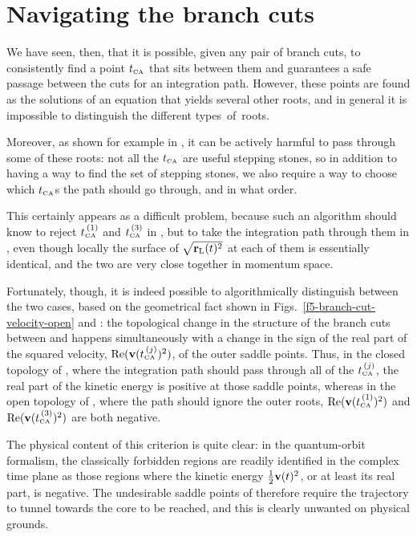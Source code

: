 \section{Navigating the branch cuts}
We have seen, then, that it is possible, given any pair of branch cuts, to consistently find a point ${t_{\scriptscriptstyle\mathrm{CA}}}$ that sits between them and guarantees a safe passage between the cuts for an integration path. However, these points are found as the solutions of an equation that yields several other roots, and in general it is impossible to distinguish the different types~of~roots. 


Moreover, as shown for example in , it can be actively harmful to pass through some of these roots: not all the ${t_{\scriptscriptstyle\mathrm{CA}}}$ are useful stepping stones, so in addition to having a way to find the set of stepping stones, we also require a way to choose which ${t_{\scriptscriptstyle\mathrm{CA}}}$s the path should go through, and in what order.

This certainly appears as a difficult problem, because such an algorithm should know to reject ${t_{\scriptscriptstyle\mathrm{CA}}^{{\,(1)}}}$ and ${t_{\scriptscriptstyle\mathrm{CA}}^{{\,(3)}}}$ in , but to take the integration path through them in , even though locally the surface of $\sqrt{\vb{r}_\mathrm{L}(t)^2}$ at each of them is essentially identical, and the two are very close together in momentum space. 

Fortunately, though, it is indeed possible to algorithmically distinguish between the two cases, based on the geometrical fact shown in Figs.~\ref{f5-branch-cut-velocity-open} and : the topological change in the structure of the branch cuts between  and  happens simultaneously with a change in the sign of the real part of the squared velocity, $\Re(\vb{v}({t_{\scriptscriptstyle\mathrm{CA}}^{{\,(j)}}})^2)$, of the outer saddle points. Thus, in the closed topology of , where the integration path should pass through all of the ${t_{\scriptscriptstyle\mathrm{CA}}^{{\,(j)}}}$, the real part of the kinetic energy is positive at those saddle points, whereas in the open topology of , where the path  should ignore the outer roots, $\Re(\vb{v}({t_{\scriptscriptstyle\mathrm{CA}}^{{\,(1)}}})^2)$ and $\Re(\vb{v}({t_{\scriptscriptstyle\mathrm{CA}}^{{\,(3)}}})^2)$ are both negative.

The physical content of this criterion is quite clear: in the quantum-orbit formalism, the classically forbidden regions are readily identified in the complex time plane as those regions where the kinetic energy $\frac12 \vb{v}(t)^2$, or at least its real part, is negative. The undesirable saddle points of  therefore require the trajectory to tunnel towards the core to be reached, and this is clearly unwanted on physical grounds.

